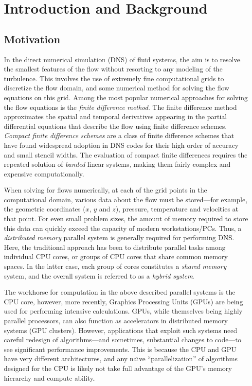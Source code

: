 \chapter{Introduction and Background}

\section{Motivation}

In the direct numerical simulation (DNS) of fluid systems,
the aim is to resolve the smallest features of the flow
without resorting to any modeling of the turbulence.
This involves the use of
extremely fine computational grids to
discretize the flow domain,
and some numerical method for solving the
flow equations on this grid.
Among the most popular numerical approaches for
solving the flow equations
is the \emph{finite difference method}.
The finite difference method approximates the
spatial and temporal derivatives appearing in the
partial differential equations that describe the flow
using finite difference schemes.
\emph{Compact finite difference schemes} are a class
of finite difference schemes that have found widespread
adoption in DNS codes
for their high order of accuracy and small stencil widths.
The evaluation of compact finite differences
requires the repeated solution of \emph{banded} linear systems,
making them fairly complex and expensive computationally.

When solving for flows numerically,
at each of the grid points in the computational domain,
various data about the flow must be stored---for
example, the geometric coordinates ($x$, $y$ and $z$),
pressure, temperature and velocities at that point.
For even small problem sizes,
the amount of memory required to store this data
can quickly exceed the capacity of modern workstations/PCs.
Thus, a \emph{distributed memory} parallel system
is generally required for performing DNS.
Here, the traditional approach has been
to distribute parallel tasks among individual CPU cores,
or groups of CPU cores
that share common memory spaces.
In the latter case,
each group of cores constitutes a \emph{shared memory} system,
and the overall system is referred to as a \emph{hybrid system}.

The workhorse for computation in the above described
parallel systems is the CPU core,
however, more recently,
Graphics Processing Units (GPUs)
are being used for performing intensive calculations.
GPUs, while themselves being highly parallel processors,
can also function as accelerators in distributed memory systems
(GPU clusters).
However,
applications that exploit such systems
need careful redesign of algorithms---and
sometimes, substantial changes to code---to
see significant performance improvements.
This is because the CPU and GPU have very different architectures,
and any na\"{\i}ve ``parallelization'' of algorithms
designed for the CPU
is likely not take full advantage of the GPU's
memory hierarchy and compute ability.

